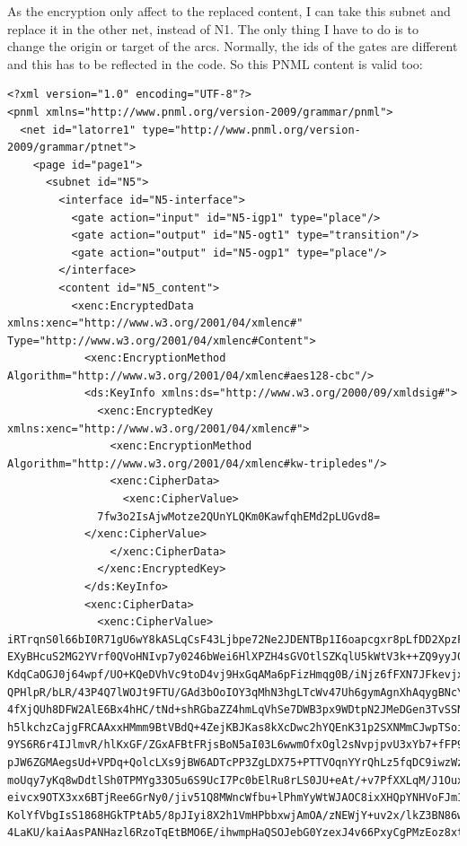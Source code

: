 As the encryption only affect to the replaced content, I can take this subnet
and replace it in the other net, instead of N1. The only thing I have to
do is to change the origin or target of the arcs. Normally, the ids of the
gates are different and this has to be reflected in the code. So this PNML content is valid
too:

\begin{lstlisting}
<?xml version="1.0" encoding="UTF-8"?>
<pnml xmlns="http://www.pnml.org/version-2009/grammar/pnml">
  <net id="latorre1" type="http://www.pnml.org/version-2009/grammar/ptnet">
    <page id="page1">
      <subnet id="N5">
        <interface id="N5-interface">
          <gate action="input" id="N5-igp1" type="place"/>
          <gate action="output" id="N5-ogt1" type="transition"/>
          <gate action="output" id="N5-ogp1" type="place"/>
        </interface>
        <content id="N5_content">
          <xenc:EncryptedData xmlns:xenc="http://www.w3.org/2001/04/xmlenc#" Type="http://www.w3.org/2001/04/xmlenc#Content">
            <xenc:EncryptionMethod Algorithm="http://www.w3.org/2001/04/xmlenc#aes128-cbc"/>
            <ds:KeyInfo xmlns:ds="http://www.w3.org/2000/09/xmldsig#">
              <xenc:EncryptedKey xmlns:xenc="http://www.w3.org/2001/04/xmlenc#">
                <xenc:EncryptionMethod Algorithm="http://www.w3.org/2001/04/xmlenc#kw-tripledes"/>
                <xenc:CipherData>
                  <xenc:CipherValue>
              7fw3o2IsAjwMotze2QUnYLQKm0KawfqhEMd2pLUGvd8=
            </xenc:CipherValue>
                </xenc:CipherData>
              </xenc:EncryptedKey>
            </ds:KeyInfo>
            <xenc:CipherData>
              <xenc:CipherValue>
iRTrqnS0l66bI0R71gU6wY8kASLqCsF43Ljbpe72Ne2JDENTBp1I6oapcgxr8pLfDD2XpzFKV9cE
EXyBHcuS2MG2YVrf0QVoHNIvp7y0246bWei6HlXPZH4sGVOtlSZKqlU5kWtV3k++ZQ9yyJ0F7pG1
KdqCaOGJ0j64wpf/UO+KQeDVhVc9toD4vj9HxGqAMa6pFizHmqg0B/iNjz6fFXN7JFkevjx6a/e8
QPHlpR/bLR/43P4Q7lWOJt9FTU/GAd3bOoIOY3qMhN3hgLTcWv47Uh6gymAgnXhAqygBNcYyHS79
4fXjQUh8DFW2AlE6Bx4hHC/tNd+shRGbaZZ4hmLqVhSe7DWB3px9WDtpN2JMeDGen3TvSSNPjAnk
h5lkchzCajgFRCAAxxHMmm9BtVBdQ+4ZejKBJKas8kXcDwc2hYQEnK31p2SXNMmCJwpTSoiNIR7s
9YS6R6r4IJlmvR/hlKxGF/ZGxAFBtFRjsBoN5aI03L6wwmOfxOgl2sNvpjpvU3xYb7+fFP9s1eJ5
pJW6ZGMAegsUd+VPDq+QolcLXs9jBW6ADTcPP3ZgLDX75+PTTVOqnYYrQhLz5fqDC9iwzWzI68bc
moUqy7yKq8wDdtlSh0TPMYg33O5u6S9UcI7Pc0bElRu8rLS0JU+eAt/+v7PfXXLqM/J1Oux9MGcJ
eivcx9OTX3xx6BTjRee6GrNy0/jiv51Q8MWncWfbu+lPhmYyWtWJAOC8ixXHQpYNHVoFJm1QOOaA
KolYfVbgIsS1868HGkTPtAb5/8pJIyi8X2h1VmHPbbxwjAmOA/zNEWjY+uv2x/lkZ3BN86wcsvW2
4LaKU/kaiAasPANHazl6RzoTqEtBMO6E/ihwmpHaQSOJebG0YzexJ4v66PxyCgPMzEoz8xtwQeQs

\end{lstlisting}

